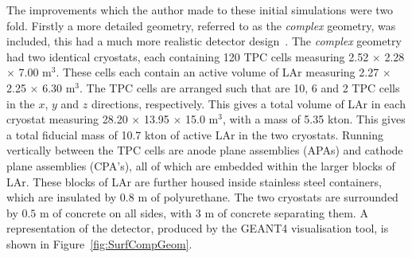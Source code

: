 The improvements which the author made to these initial simulations were two fold. Firstly a more detailed geometry, referred to as the \emph{complex} geometry, was included, this had a much more realistic detector design~\citep{LBNE3383}. The \emph{complex} geometry had two identical cryostats, each containing 120 TPC cells measuring 2.52 $\times$ 2.28 $\times$ 7.00 m$^3$. These cells each contain an active volume of LAr measuring 2.27 $\times$ 2.25 $\times$ 6.30 m$^3$. The TPC cells are arranged such that are 10, 6 and 2 TPC cells in the $x$, $y$ and $z$ directions, respectively. This gives a total volume of LAr in each cryostat measuring 28.20 $\times$ 13.95 $\times$ 15.0 m$^3$, with a mass of 5.35 kton. This gives a total fiducial mass of 10.7 kton of active LAr in the two cryostats. Running vertically between the TPC cells are anode plane assemblies (APAs) and cathode plane assemblies (CPA's), all of which are embedded within the larger blocks of LAr. These blocks of LAr are further housed inside stainless steel containers, which are insulated by $0.8$ m of polyurethane. The two cryostats are surrounded by $0.5$ m of concrete on all sides, with $3$ m of concrete separating them. A representation of the detector, produced by the GEANT4 visualisation tool, is shown in Figure~\ref{fig:SurfCompGeom}. \\


